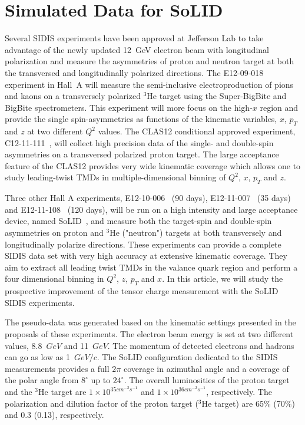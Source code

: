 \documentclass[twocolumn,showpacs,preprintnumbers,amsmath,amssymb,floatfix,prd]{revtex4}
\begin{document}
\section{Simulated Data for SoLID}
%
Several SIDIS experiments have been approved at Jefferson Lab to take advantage of the newly updated 12~GeV electron beam with longitudinal polarization and measure the asymmetries of proton and neutron target at both the transversed and longitudinally polarized directions. The  E12-09-018 experiment in Hall~A \cite{e1209018} will measure the semi-inclusive electroproduction of pions and kaons on a transversely polarized $\mathrm{^{3}He}$ target using the Super-BigBite and BigBite spectrometers. This experiment will more focus on the high-$x$ region and provide the single spin-asymmetries as functions of the kinematic variables, $x$, $p_{T}$ and $z$ at two different $Q^{2}$ values.   The CLAS12 conditional approved experiment, C12-11-111~\cite{c1211111}, will collect high precision data of the single- and double-spin asymmetries on a transversed polarized proton target. The large acceptance feature of the CLAS12 provides very wide  kinematic coverage which allows one to study  leading-twist TMDs in multiple-dimensional binning of $Q^{2}$, $x$, $p_{T}$ and $z$.

Three other Hall A experiments, E12-10-006~\cite{1210006} (90 days), E12-11-007~\cite{e1211007} (35 days) and E12-11-108~\cite{e1211108} (120 days), will be run on a high intensity and large acceptance device, named SoLID~\cite{solid_pcdr}, and measure both the target-spin and double-spin asymmetries on proton and  $\mathrm{^{3}He}$ ("neutron") targets at both  transversely and longitudinally polarize directions. These experiments can provide a complete SIDIS data set with very high accuracy at extensive kinematic coverage. They aim to extract all leading twist TMDs in the valance quark region and perform a  four dimensional binning in $Q^{2}$, $z$, $p_{T}$ and $x$. In this article, we will study the prospective improvement of the tensor charge measurement  with the SoLID SIDIS experiments. 

The pseudo-data was generated based on the kinematic settings presented in the proposals of these experiments. The electron beam energy is set at two different values, 8.8~$GeV$ and 11~$GeV$. The momentum of detected electrons and hadrons can go as low as 1~$GeV/c$. The SoLID configuration dedicated to the SIDIS measurements provides a full $2\pi$ coverage in azimuthal angle and a coverage of the polar angle from $8^{\circ}$ up to $24^{\circ}$.  The overall luminosities of the proton target and the $\mathrm{^{3}He}$ target are  $1\times 10^{35 cm^{-2}s^{-1}}$ and $1\times 10^{36 cm^{-2}s^{-1}}$, respectively.  The polarization and dilution factor of the proton target ($\mathrm{^{3}He}$ target) are 65\% (70\%) and 0.3 (0.13), respectively. 
\end{document}
